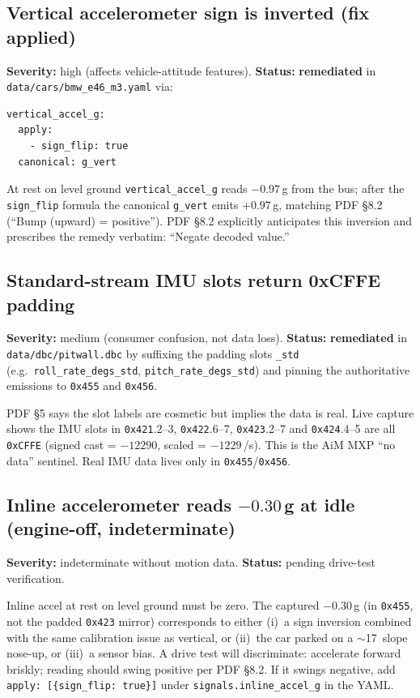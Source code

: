 \documentclass[11pt,a4paper]{article}
\newcommand{\hex}[1]{\texttt{0x#1}}
\begin{document}
\subsection{Vertical accelerometer sign is inverted (fix applied)}

\textbf{Severity:} high (affects vehicle-attitude features).
\textbf{Status:} \textbf{remediated} in
\texttt{data/cars/bmw\_e46\_m3.yaml} via:
\begin{lstlisting}
vertical_accel_g:
  apply:
    - sign_flip: true
  canonical: g_vert
\end{lstlisting}
At rest on level ground \texttt{vertical\_accel\_g} reads $-0.97$\,g
from the bus; after the \texttt{sign\_flip} formula the canonical
\texttt{g\_vert} emits $+0.97$\,g, matching PDF \S 8.2 (``Bump
(upward) = positive''). PDF \S 8.2 explicitly anticipates this
inversion and prescribes the remedy verbatim: ``Negate decoded
value.''

\subsection{Standard-stream IMU slots return 0xCFFE padding}

\textbf{Severity:} medium (consumer confusion, not data loss).
\textbf{Status:} \textbf{remediated} in
\texttt{data/dbc/pitwall.dbc} by suffixing the padding slots
\texttt{\_std} (e.g.\ \texttt{roll\_rate\_degs\_std},
\texttt{pitch\_rate\_degs\_std}) and pinning the authoritative
emissions to \hex{455} and \hex{456}.

PDF \S 5 says the slot labels are cosmetic but implies the data is
real. Live capture shows the IMU slots in \hex{421}.2--3,
\hex{422}.6--7, \hex{423}.2--7 and \hex{424}.4--5 are all
\hex{CFFE} (signed cast = $-12290$, scaled = $-1229$\,\textdegree/s).
This is the AiM MXP ``no data'' sentinel. Real IMU data lives only
in \hex{455}/\hex{456}.

\subsection{Inline accelerometer reads $-0.30$\,g at idle (engine-off, indeterminate)}

\textbf{Severity:} indeterminate without motion data.
\textbf{Status:} pending drive-test verification.

Inline accel at rest on level ground must be zero. The captured
$-0.30$\,g (in \hex{455}, not the padded \hex{423} mirror)
corresponds to either (i)~a sign inversion combined with the same
calibration issue as vertical, or (ii)~the car parked on a
$\sim$17\textdegree\ slope nose-up, or (iii)~a sensor bias. A drive
test will discriminate: accelerate forward briskly; reading should
swing positive per PDF \S 8.2. If it swings negative, add
\texttt{apply: [\{sign\_flip: true\}]} under
\texttt{signals.inline\_accel\_g} in the YAML.
\end{document}
